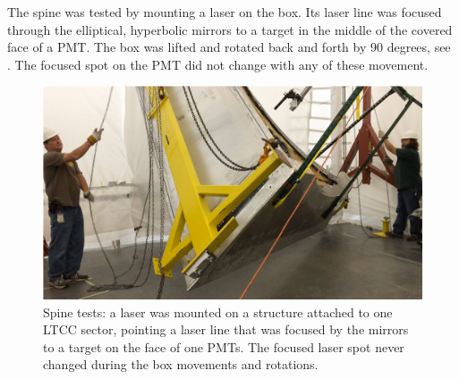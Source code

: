 The spine was tested by mounting a laser on the box. Its laser line was focused through the elliptical, hyperbolic mirrors to a target in the middle of the covered face of a PMT.
The box was lifted and rotated back and forth by $90$ degrees, see . The focused spot on the PMT did not change with any of these movement.

\begin{figure}
	\centering
	\includegraphics[width=1.0\columnwidth,keepaspectratio]{img/spineTest.png}
	\caption{Spine tests: a laser was mounted on a structure attached to one LTCC sector, pointing a laser line that was focused by the mirrors to a target on the face of one PMTs. The focused laser
            spot never changed during the box movements and rotations.}
	\label{fig:spineTest}
\end{figure}





